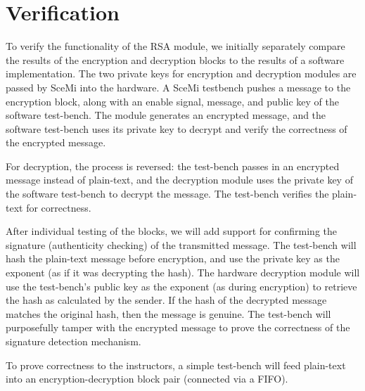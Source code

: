 \documentclass[12pt]{article}
\begin{document}
\section{Verification}
To verify the functionality of the RSA module, we initially separately 
compare the results of the encryption and decryption blocks to the results
of a software implementation. The two private keys for encryption and
decryption modules are passed by SceMi into the hardware. A SceMi testbench
pushes a message to the encryption block, along with an enable signal, message,
and public key of the software test-bench. The module generates an encrypted message,
and the software test-bench uses its private key to decrypt and verify the 
correctness of the encrypted message.

For decryption, the process is reversed: the test-bench passes in an 
encrypted message instead of plain-text, and the decryption module uses
the private key of the software test-bench to decrypt the message. The test-bench
verifies the plain-text for correctness.

After individual testing of the blocks, we will add support for confirming the signature
(authenticity checking) of the transmitted message. The test-bench will hash the plain-text
message before encryption, and use the private key as the exponent (as if it was decrypting
the hash). The hardware decryption module will use the test-bench's public key as the exponent
(as during encryption) to retrieve the hash as calculated by the sender. If the hash of the
decrypted message matches the original hash, then the message is genuine. The test-bench
will purposefully tamper with the encrypted message to prove the correctness of the 
signature detection mechanism. 

To prove correctness to the instructors, a simple test-bench will feed plain-text into an
encryption-decryption block pair (connected via a FIFO).
\end{document}
